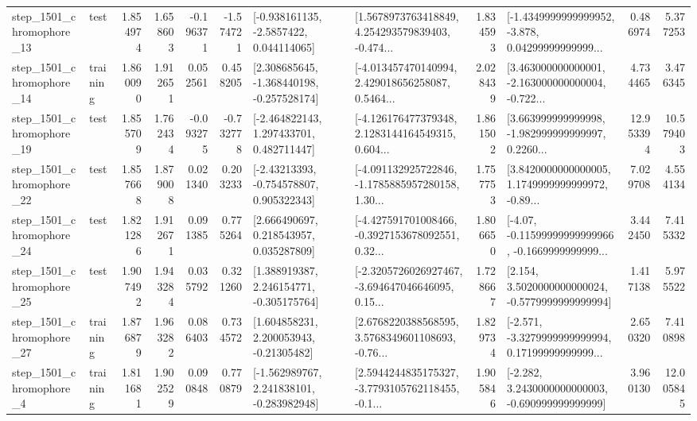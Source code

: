 \begin{tabular}{llrrrrllrlrr}
 step\_1501\_chromophore\_13 &      test &      1.854974 &    1.658603 &     -0.196371 & -1.574721 &     [-0.938161135, -2.5857422, 0.044114065] &  [1.5678973763418849, 4.254293579839403, -0.474... &       1.834593 &  [-1.4349999999999952, -3.878, 0.04299999999999... &            0.486974 &          5.377253 \\
 step\_1501\_chromophore\_14 &  training &      1.860090 &    1.912651 &      0.052561 &  0.458205 &   [2.308685645, -1.368440198, -0.257528174] &  [-4.013457470140994, 2.429018656258087, 0.5464... &       2.028439 &  [3.463000000000001, -2.163000000000004, -0.722... &            4.734465 &          3.476345 \\
 step\_1501\_chromophore\_19 &      test &      1.855709 &    1.762434 &     -0.093275 & -0.732778 &    [-2.464822143, 1.297433701, 0.482711447] &  [-4.126176477379348, 2.1283144164549315, 0.604... &       1.861502 &  [3.663999999999998, -1.982999999999997, 0.2260... &           12.953394 &         10.579403 \\
 step\_1501\_chromophore\_22 &      test &      1.857668 &    1.879008 &      0.021340 &  0.203233 &    [-2.43213393, -0.754578807, 0.905322343] &  [-4.091132925722846, -1.1785885957280158, 1.30... &       1.757753 &  [3.8420000000000005, 1.1749999999999972, -0.89... &            7.029708 &          4.554134 \\
 step\_1501\_chromophore\_24 &      test &      1.821286 &    1.912671 &      0.091385 &  0.775264 &     [2.666490697, 0.218543957, 0.035287809] &  [-4.427591701008466, -0.3927153678092551, 0.32... &       1.806650 &  [-4.07, -0.11599999999999966, -0.1669999999999... &            3.442450 &          7.415332 \\
 step\_1501\_chromophore\_25 &      test &      1.907492 &    1.943284 &      0.035792 &  0.321260 &    [1.388919387, 2.246154771, -0.305175764] &  [-2.3205726026927467, -3.694647046646095, 0.15... &       1.728667 &   [2.154, 3.5020000000000024, -0.5779999999999994] &            1.417138 &          5.975522 \\
 step\_1501\_chromophore\_27 &  training &      1.876879 &    1.963282 &      0.086403 &  0.734572 &     [1.604858231, 2.200053943, -0.21305482] &  [2.6768220388568595, 3.5768349601108693, -0.76... &       1.829734 &  [-2.571, -3.3279999999999994, 0.17199999999999... &            2.650320 &          7.410898 \\
  step\_1501\_chromophore\_4 &  training &      1.811681 &    1.902529 &      0.090848 &  0.770879 &   [-1.562989767, 2.241838101, -0.283982948] &  [2.5944244835175327, -3.7793105762118455, -0.1... &       1.905846 &   [-2.282, 3.2430000000000003, -0.690999999999999] &            3.960130 &         12.005845 \\

\end{tabular}
